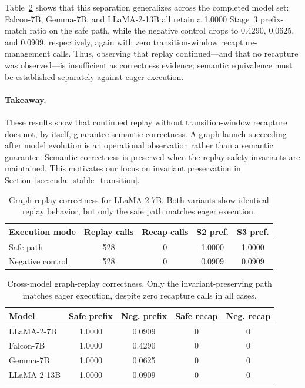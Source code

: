 \documentclass[sigplan,anonymous,review,nonacm]{acmart}
\begin{document}
Table~\ref{tab:graph-replay-correctness-multimodel} shows that this separation generalizes across the completed model set: Falcon-7B, Gemma-7B, and LLaMA-2-13B all retain a 1.0000 Stage~3 prefix-match ratio on the safe path, while the negative control drops to 0.4290, 0.0625, and 0.0909, respectively, again with zero transition-window recapture-management calls. Thus, observing that replay continued—and that no recapture was observed—is insufficient as correctness evidence; semantic equivalence must be established separately against eager execution.

\paragraph{Takeaway.}
These results show that continued replay without transition-window recapture does not, by itself, guarantee semantic correctness. A graph launch succeeding after model evolution is an operational observation rather than a semantic guarantee. Semantic correctness is preserved when the replay-safety invariants are maintained. This motivates our focus on invariant preservation in Section~\ref{sec:cuda_stable_transition}.

\begin{table}[t]
\centering
\caption{Graph-replay correctness for LLaMA-2-7B. Both variants show identical replay behavior, but only the safe path matches eager execution.}
\label{tab:graph-replay-correctness}

\small

\begin{tabular*}{\columnwidth}{@{\extracolsep{\fill}}lcccc}
\toprule
Execution mode & Replay calls & Recap calls & S2 pref. & S3 pref. \\
\midrule
Safe path         & 528 & 0 & 1.0000 & 1.0000 \\
Negative control  & 528 & 0 & 0.0909 & 0.0909 \\
\bottomrule
\end{tabular*}
\end{table}

\begin{table}[t]
\centering
\caption{Cross-model graph-replay correctness. Only the invariant-preserving path matches eager execution, despite zero recapture calls in all cases.}
\label{tab:graph-replay-correctness-multimodel}

\small
\setlength{\tabcolsep}{3pt}
\renewcommand{\arraystretch}{0.95}

\begin{tabular}{lcccc}
\toprule
Model & Safe prefix & Neg. prefix & Safe recap & Neg. recap \\
\midrule
LLaMA-2-7B  & 1.0000 & 0.0909 & 0 & 0 \\
Falcon-7B   & 1.0000 & 0.4290 & 0 & 0 \\
Gemma-7B    & 1.0000 & 0.0625 & 0 & 0 \\
LLaMA-2-13B & 1.0000 & 0.0909 & 0 & 0 \\
\bottomrule
\end{tabular}
\end{table}
\end{document}
